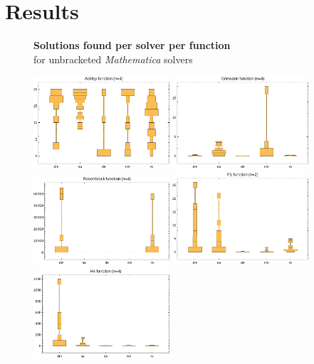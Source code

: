 \documentclass[12pt]{article}
\begin{document}
\pagebreak

\section{Results}
\begin{figure}[H]
    \begin{center}
        {\large {\bfseries Solutions found per solver per function}\\
        for unbracketed \emph{Mathematica} solvers}

        \includegraphics[width=0.45\textwidth]{../figures/ackley-fun-bad.pdf}
        \includegraphics[width=0.45\textwidth]{../figures/griewank-fun-bad.pdf}
        \includegraphics[width=0.45\textwidth]{../figures/rosenbrock-fun-bad.pdf}
        \includegraphics[width=0.45\textwidth]{../figures/f1-fun-bad.pdf}
        \includegraphics[width=0.45\textwidth]{../figures/h4-fun-bad.pdf}


\end{center}
\end{figure}
\end{document}
